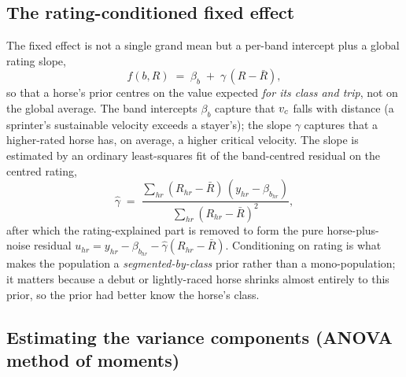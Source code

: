 \subsection{The rating-conditioned fixed effect}

The fixed effect is not a single grand mean but a per-band intercept plus a global rating slope,
\begin{equation}
  f(b,R) \;=\; \beta_b \;+\; \gamma\,(R-\bar R),
  \label{eq:fixed}
\end{equation}
so that a horse's prior centres on the value expected \emph{for its class and trip}, not on the
global average. The band intercepts $\beta_b$ capture that ${v_{c}}$ falls with distance (a sprinter's
sustainable velocity exceeds a stayer's); the slope $\gamma$ captures that a higher-rated horse
has, on average, a higher critical velocity. The slope is estimated by an ordinary least-squares
fit of the band-centred residual on the centred rating,
\begin{equation}
  \widehat\gamma
   \;=\; \frac{\sum_{hr}(R_{hr}-\bar R)\,(y_{hr}-\beta_{b_{hr}})}{\sum_{hr}(R_{hr}-\bar R)^2},
  \label{eq:slope}
\end{equation}
after which the rating-explained part is removed to form the pure horse-plus-noise residual
$u_{hr} = y_{hr} - \beta_{b_{hr}} - \widehat\gamma(R_{hr}-\bar R)$. Conditioning on rating is what
makes the population a \emph{segmented-by-class} prior rather than a mono-population; it matters
because a debut or lightly-raced horse shrinks almost entirely to this prior, so the prior had
better know the horse's class.

\subsection{Estimating the variance components (ANOVA method of moments)}

